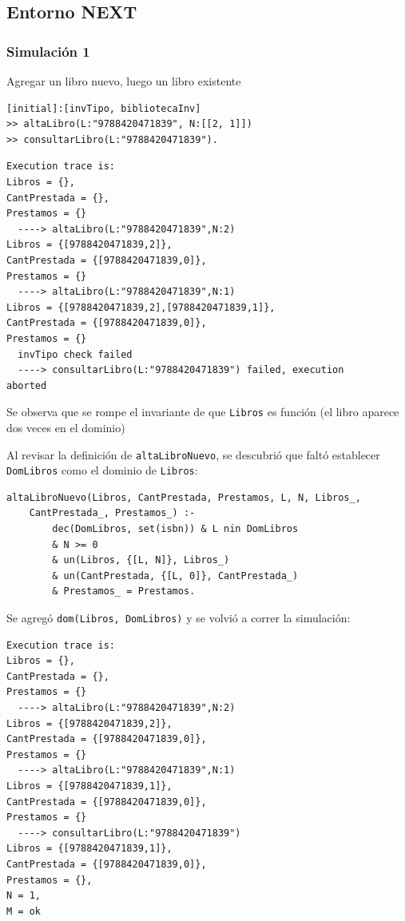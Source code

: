 \documentclass{article}
\begin{document}
\subsection{Entorno NEXT}
\subsubsection*{Simulación 1}
Agregar un libro nuevo, luego un libro existente

\begin{verbatim}
[initial]:[invTipo, bibliotecaInv] 
>> altaLibro(L:"9788420471839", N:[[2, 1]]) 
>> consultarLibro(L:"9788420471839").
\end{verbatim}

\begin{verbatim}
Execution trace is:
Libros = {},  
CantPrestada = {},  
Prestamos = {}
  ----> altaLibro(L:"9788420471839",N:2)
Libros = {[9788420471839,2]},  
CantPrestada = {[9788420471839,0]},  
Prestamos = {}
  ----> altaLibro(L:"9788420471839",N:1)
Libros = {[9788420471839,2],[9788420471839,1]},  
CantPrestada = {[9788420471839,0]},  
Prestamos = {}
  invTipo check failed
  ----> consultarLibro(L:"9788420471839") failed, execution 
aborted
\end{verbatim}

Se observa que se rompe el invariante de que \texttt{Libros} es función (el libro aparece dos veces en el dominio)

Al revisar la definición de \texttt{altaLibroNuevo}, se descubrió que faltó establecer \texttt{DomLibros} como el dominio de \texttt{Libros}:

\begin{verbatim}
altaLibroNuevo(Libros, CantPrestada, Prestamos, L, N, Libros_, 
    CantPrestada_, Prestamos_) :-
        dec(DomLibros, set(isbn)) & L nin DomLibros
        & N >= 0
        & un(Libros, {[L, N]}, Libros_)
        & un(CantPrestada, {[L, 0]}, CantPrestada_)
        & Prestamos_ = Prestamos.
\end{verbatim}

Se agregó \verb|dom(Libros, DomLibros)| y se volvió a correr la simulación:

\begin{verbatim}
Execution trace is:
Libros = {},  
CantPrestada = {},  
Prestamos = {}
  ----> altaLibro(L:"9788420471839",N:2)
Libros = {[9788420471839,2]},  
CantPrestada = {[9788420471839,0]},  
Prestamos = {}
  ----> altaLibro(L:"9788420471839",N:1)
Libros = {[9788420471839,1]},  
CantPrestada = {[9788420471839,0]},  
Prestamos = {}
  ----> consultarLibro(L:"9788420471839")
Libros = {[9788420471839,1]},  
CantPrestada = {[9788420471839,0]},  
Prestamos = {},  
N = 1,  
M = ok
\end{verbatim}
\end{document}

